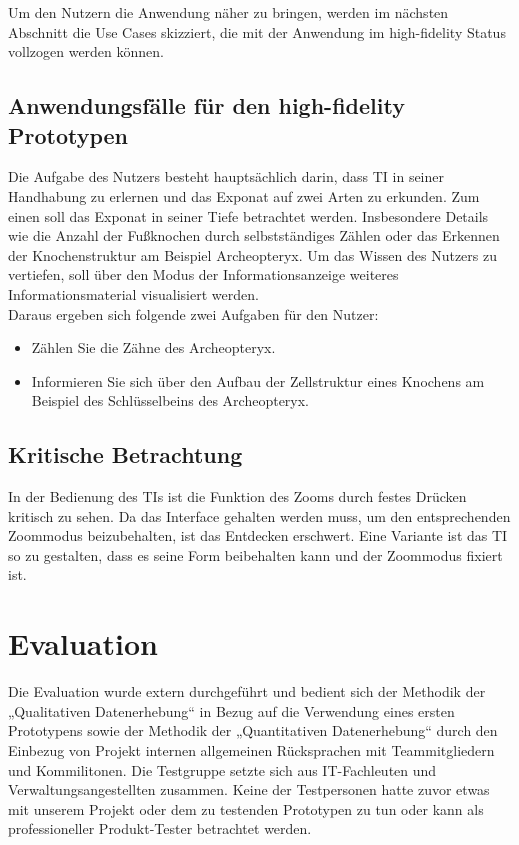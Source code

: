 \documentclass[runningheads,a4paper, 12pt]{llncs}
\begin{document}
Um den Nutzern die Anwendung näher zu bringen, werden im nächsten Abschnitt die Use Cases skizziert, die mit der Anwendung im high-fidelity Status vollzogen werden können.\\

\subsection{Anwendungsfälle für den high-fidelity Prototypen}
Die Aufgabe des Nutzers besteht hauptsächlich darin, dass TI in seiner Handhabung zu erlernen und das Exponat auf zwei Arten zu erkunden. Zum einen soll das Exponat in seiner Tiefe betrachtet werden. Insbesondere Details wie die Anzahl der Fußknochen durch selbstständiges Zählen oder das Erkennen der Knochenstruktur am Beispiel Archeopteryx. Um das Wissen des Nutzers zu vertiefen, soll über den Modus der Informationsanzeige weiteres Informationsmaterial visualisiert werden.\\ 

Daraus ergeben sich folgende zwei Aufgaben für den Nutzer:

\begin{itemize}
	\item Zählen Sie die Zähne des Archeopteryx.
	\item Informieren Sie sich über den Aufbau der Zellstruktur eines Knochens am Beispiel des Schlüsselbeins des Archeopteryx.
\end{itemize}

\subsection{Kritische Betrachtung}
In der Bedienung des TIs ist die Funktion des Zooms durch festes Drücken kritisch zu sehen. Da das Interface gehalten werden muss, um den entsprechenden Zoommodus beizubehalten, ist das Entdecken erschwert. Eine Variante ist das TI so zu gestalten, dass es seine Form beibehalten kann und der Zoommodus fixiert ist.\\

\section{Evaluation}
Die Evaluation wurde extern durchgeführt und bedient sich der Methodik der „Qualitativen Datenerhebung“ in Bezug auf die Verwendung eines ersten Prototypens sowie der Methodik der „Quantitativen Datenerhebung“ durch den Einbezug von Projekt internen allgemeinen Rücksprachen mit Teammitgliedern und Kommilitonen. Die Testgruppe setzte sich aus IT-Fachleuten und Verwaltungsangestellten zusammen. Keine der Testpersonen hatte zuvor etwas mit unserem Projekt oder dem zu testenden Prototypen zu tun oder kann als professioneller Produkt-Tester betrachtet werden.
\end{document}
